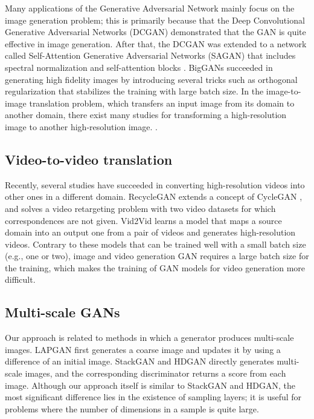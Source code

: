 \documentclass[twocolumn]{svjour3}
\begin{document}
Many applications of the Generative Adversarial Network \cite{Goodfellow2014} mainly focus on the image generation problem; this is primarily because that the Deep Convolutional Generative Adversarial Networks (DCGAN) \cite{Radford2016} demonstrated that the GAN is quite effective in image generation.
After that, the DCGAN was extended to a network called Self-Attention Generative Adversarial Networks (SAGAN) \cite{Zhang2018} that includes spectral normalization \cite{Miyato2018} and self-attention blocks \cite{Wang2018b}.
BigGANs \cite{Brock2018} succeeded in generating high fidelity images by introducing several tricks such as orthogonal regularization that stabilizes the training with large batch size.
In the image-to-image translation problem, which transfers an input image from its domain to another domain,
there exist many studies for transforming a high-resolution image to another high-resolution image. \cite{Isola2017,Wang2018a,Zhu2017,Liu2017,Huang2018}.

\subsection{Video-to-video translation}


Recently, several studies have succeeded in converting high-resolution videos into other ones in a different domain. RecycleGAN \cite{Bansal2018} extends a concept of CycleGAN \cite{Zhu2017}, and solves a video retargeting problem with two video datasets for which correspondences are not given.
Vid2Vid \cite{Wang2018} learns a model that maps a source domain into an output one from a pair of videos and generates high-resolution videos.
Contrary to these models that can be trained well with a small batch size (e.g., one or two),
image and video generation GAN requires a large batch size for the training, which makes the training of GAN models for video generation more difficult.

\subsection{Multi-scale GANs}




Our approach is related to methods in which a generator produces multi-scale images.
LAPGAN \cite{Denton2015} first generates a coarse image and updates it by using a difference of an initial image.
StackGAN \cite{Zhang2017,Zhang2017a} and HDGAN \cite{Zhang2018a} directly generates multi-scale images, and the corresponding discriminator returns a score from each image.
Although our approach itself is similar to StackGAN and HDGAN,
the most significant difference lies in the existence of sampling layers;
it is useful for problems where the number of dimensions in a sample is quite large.
\end{document}
